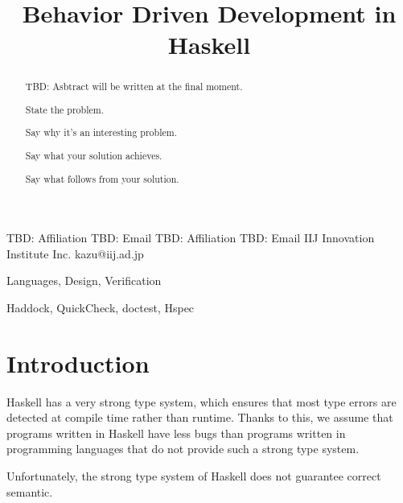 \documentclass[preprint]{sigplanconf}
\begin{document}
\copyrightdata{[to be supplied]}


\title{Behavior Driven Development in Haskell}

           {TBD: Affiliation}
           {TBD: Email}
           {TBD: Affiliation}
           {TBD: Email}
           {IIJ Innovation Institute Inc.}
           {kazu@iij.ad.jp}

\maketitle

\begin{abstract}

TBD: Asbtract will be written at the final moment.

State the problem.

Say why it’s an interesting problem.

Say what your solution achieves.

Say what follows from your solution.

\end{abstract}


\terms Languages, Design, Verification

\keywords Haddock, QuickCheck, doctest, Hspec

\section{Introduction}


Haskell has a very strong type system, which ensures that most type errors are
detected at compile time rather than runtime.  Thanks to this, we assume that
programs written in Haskell have less bugs than programs written in programming
languages that do not provide such a strong type system.

Unfortunately, the strong type system of Haskell does not guarantee correct
semantic.
\end{document}
